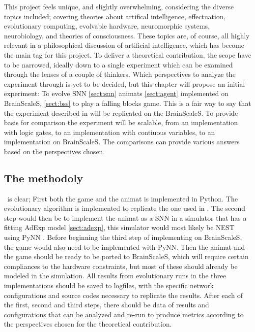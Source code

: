 This project feels unique, and slightly overwhelming, considering the diverse topics included; covering theories about artifical intelligence, effectuation, evolutionary computing, evolvable hardware, neuromorphic systems, neurobiology, and theories of consciousness.
These topics are, of course, all highly relevant in a philosophical discussion of artificial intelligence, which has become the main tag for this project.
To deliver a theoretical contribution, the scope have to be narrowed, ideally down to a single experiment which can be examined through the lenses of a couple of thinkers.
Which perspectives to analyze the experiment through is yet to be decided, but this chapter will propose an initial experiment:
To evolve SNN \vref{sect:snn} animats \vref{sect:agent} implemented on BrainScaleS, \vref{sect:bss} to play a falling blocks game.
This is a fair way to say that the experiment described in \cite{albantakis_evolution_2014} will be replicated on the BrainScaleS.
To provide basis for comparison the experiment will be scalable, from an implementation with logic gates, to an implementation with contiuous variables, to an implementation on BrainScaleS.
The comparisons can provide various answers based on the perspectives chosen.

\subsection{The methodoly} is clear; First both the game and the animat is implemented in Python.
The evolutionary algorithm is implemented to replicate the one used in \cite{albantakis_evolution_2014}.
The second step would then be to implement the animat as a SNN in a simulator that has a fitting AdExp model \vref{sect:adexp},
this simulator would most likely be NEST \cite{fardet_nest_2020} using PyNN \cite{davison_pynn_2009}.
Before beginning the third step of implementing on BrainScaleS, the game would also need to be implemented with PyNN.
Then the animat and the game should be ready to be ported to BrainScaleS, which will require certain compliances to the hardware constraints,
but most of these should already be modeled in the simulation.
All results from evolutionary runs in the three implementations should be saved to logfiles, with the specific network configurations and source codes necessary to replicate the results.
After each of the first, second and third steps, there should be data of results and configurations that can be analyzed and re-run to produce metrics according to the perspectives chosen for the theoretical contribution.


